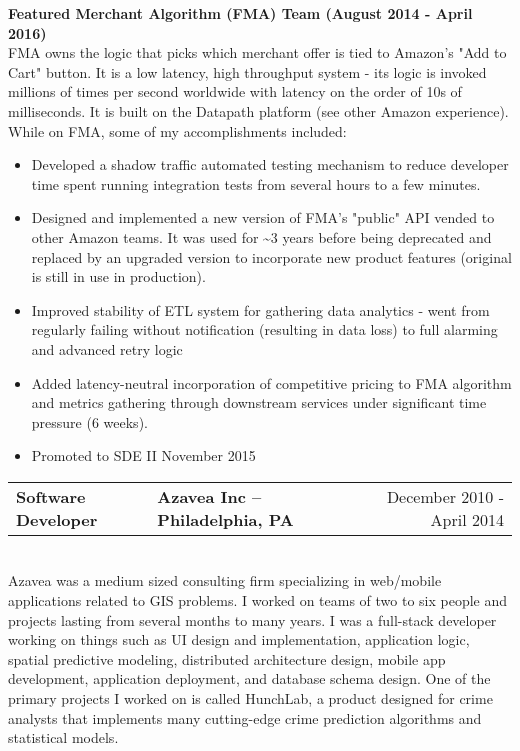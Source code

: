 \documentclass{res}
\newlength{\vsep}
\begin{document}
\begin{resume}
   \vspace{\vsep}
   {\large \bf Featured Merchant Algorithm (FMA) Team (August 2014 - April 2016)}\\
   FMA owns the logic that picks which merchant offer is tied to Amazon's "Add to Cart" button. It is a low latency, high throughput system - its logic is invoked millions of times per second worldwide with latency on the order of 10s of milliseconds.  It is built on the Datapath platform (see other Amazon experience).  While on FMA, some of my accomplishments included:
   \begin{itemize}
   \item Developed a shadow traffic automated testing mechanism to reduce developer time spent running integration tests from several hours to a few minutes.
   \item Designed and implemented a new version of FMA's "public" API vended to other Amazon teams.  It was used for \textasciitilde 3 years before being deprecated and replaced by an upgraded version to incorporate new product features (original is still in use in production).
   \item Improved stability of ETL system for gathering data analytics - went from regularly failing without notification (resulting in data loss) to full alarming and advanced retry logic
   \item Added latency-neutral incorporation of competitive pricing to FMA algorithm and metrics gathering through downstream services under significant time pressure (6 weeks).
   \item Promoted to SDE II November 2015
   \end{itemize}
   \vspace{\vsep}
   
   \begin{tabularx}{\textwidth}{@{}>{\bf}l>{\large\bf\centering\arraybackslash}Xr@{}}
   Software Developer & Azavea Inc -- Philadelphia, PA & December 2010 - April 2014\vspace{\vsep}\\
   \end{tabularx}\\
   Azavea was a medium sized consulting firm specializing in web/mobile applications related to GIS problems.  I worked on teams of two to six people and projects lasting from several months to many years.  I was a full-stack developer working on things such as UI design and implementation, application logic, spatial predictive modeling, distributed architecture design, mobile app development, application deployment, and database schema design.  One of the primary projects I worked on is called HunchLab, a product designed for crime analysts that implements many cutting-edge crime prediction algorithms and statistical models.\\


\end{resume}
\end{document}
